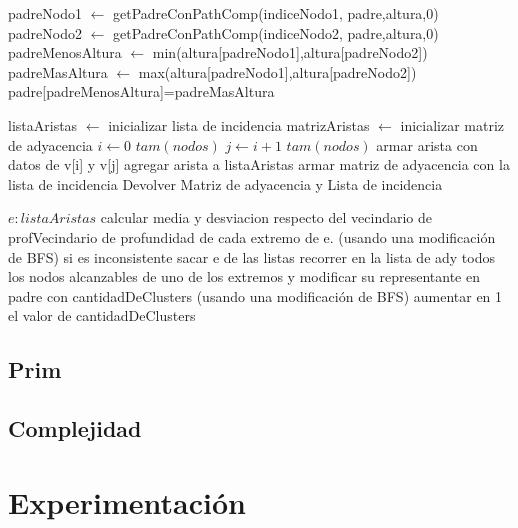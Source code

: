 \documentclass[8pt,a4paper]{article}
\begin{document}
\begin{codebox}
\li padreNodo1 $\gets$ getPadreConPathComp(indiceNodo1, padre,altura,0)
\li padreNodo2 $\gets$ getPadreConPathComp(indiceNodo2, padre,altura,0)
\li padreMenosAltura $\gets$ min(altura[padreNodo1],altura[padreNodo2])
\li padreMasAltura $\gets$ max(altura[padreNodo1],altura[padreNodo2])
\li padre[padreMenosAltura]=padreMasAltura
\end{codebox}


\begin{codebox}
\li listaAristas $\gets$ inicializar lista de incidencia
\li matrizAristas $\gets$ inicializar matriz de adyacencia
\li \For $i \gets 0$ \To $tam(nodos)$
\li 	\For  $j \gets i+1$ \To $tam(nodos)$
			\li armar arista con datos de v[i] y v[j]
			\li agregar arista a listaAristas
		\End
	\End
\li armar matriz de adyacencia con la lista de incidencia
\li Devolver Matriz de adyacencia y Lista de incidencia
\end{codebox}

\begin{codebox}
\li \For $e:listaAristas$
\li calcular media y desviacion respecto del vecindario de profVecindario de profundidad de cada extremo de e. (usando una modificación de BFS)
\li si es inconsistente
\li sacar e de las listas
\li recorrer en la lista de ady todos los nodos alcanzables de uno de los extremos y modificar su representante en padre con cantidadDeClusters (usando una modificación de BFS)
\li aumentar en 1 el valor de cantidadDeClusters

\li \End
\end{codebox}

\subsection{Prim}

\subsection{Complejidad}

\section{Experimentación}
\end{document}
